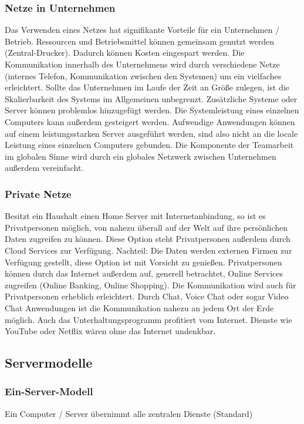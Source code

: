 \documentclass[12pt,a4paper]{article}
\begin{document}
\subsubsection{Netze in Unternehmen}
Das Verwenden eines Netzes hat signifikante Vorteile für ein Unternehmen / Betrieb. Ressourcen und Betriebsmittel können gemeinsam genutzt werden (Zentral-Drucker). Dadurch können Kosten eingespart werden. Die Kommunikation innerhalb des Unternehmens wird durch verschiedene Netze (internes Telefon, Kommunikation zwischen den Systemen) um ein vielfaches erleichtert. Sollte das Unternehmen im Laufe der Zeit an Größe zulegen, ist die Skalierbarkeit des Systems im Allgemeinen unbegrenzt. Zusätzliche Systeme oder Server können problemlos hinzugefügt werden. Die Systemleistung eines einzelnen Computers kann außerdem gesteigert werden. Aufwendige Anwendungen können auf einem leistungsstarken Server ausgeführt werden, sind also nicht an die locale Leistung eines einzelnen Computers gebunden. Die Komponente der Teamarbeit im globalen Sinne wird durch ein globales Netzwerk zwischen Unternehmen außerdem vereinfacht.

\subsubsection{Private Netze}
Besitzt ein Haushalt einen Home Server mit Internetanbindung, so ist es Privatpersonen möglich, von nahezu überall auf der Welt auf ihre persönlichen Daten zugreifen zu können. Diese Option steht Privatpersonen außerdem durch Cloud Services zur Verfügung. Nachteil: Die Daten werden externen Firmen zur Verfügung gestellt, diese Option ist mit Vorsicht zu genießen. Privatpersonen können durch das Internet außerdem auf, generell betrachtet, Online Services zugreifen (Online Banking, Online Shopping). Die Kommunikation wird auch für Privatpersonen erheblich erleichtert. Durch Chat, Voice Chat oder sogar Video Chat Anwendungen ist die Kommunikation nahezu an jedem Ort der Erde möglich. Auch das Unterhaltungsprogramm profitiert vom Internet. Dienste wie YouTube oder Netflix wären ohne das Internet undenkbar.

\subsection{Servermodelle}

\subsubsection{Ein-Server-Modell}
Ein Computer / Server übernimmt alle zentralen Dienste (Standard)
\end{document}
